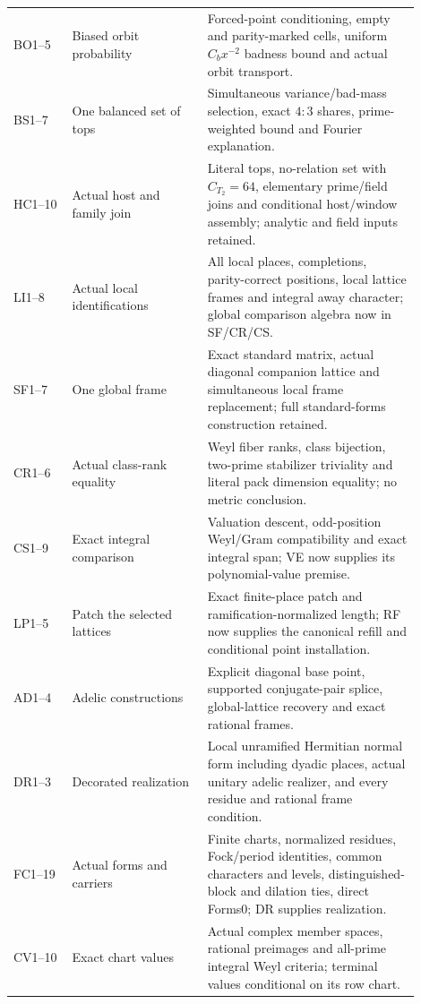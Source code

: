 \documentclass[11pt,a4paper]{article}
\numberwithin{equation}{section}
\theoremstyle{remark}\newtheorem{remark}[theorem]{Remark}
\begin{document}
\begin{longtable}{>{\raggedright\arraybackslash}p{0.13\linewidth}>{\raggedright\arraybackslash}p{0.30\linewidth}>{\raggedright\arraybackslash}p{0.47\linewidth}}
BO1--5 & Biased orbit probability & Forced-point conditioning, empty and parity-marked cells, uniform $C_bx^{-2}$ badness bound and actual orbit transport.\\[3pt]
BS1--7 & One balanced set of tops & Simultaneous variance/bad-mass selection, exact $4:3$ shares, prime-weighted bound and Fourier explanation.\\[3pt]
HC1--10 & Actual host and family join & Literal tops, no-relation set with $C_{T_2}=64$, elementary prime/field joins and conditional host/window assembly; analytic and field inputs retained.\\[3pt]
LI1--8 & Actual local identifications & All local places, completions, parity-correct positions, local lattice frames and integral away character; global comparison algebra now in SF/CR/CS.\\[3pt]
SF1--7 & One global frame & Exact standard matrix, actual diagonal companion lattice and simultaneous local frame replacement; full standard-forms construction retained.\\[3pt]
CR1--6 & Actual class-rank equality & Weyl fiber ranks, class bijection, two-prime stabilizer triviality and literal pack dimension equality; no metric conclusion.\\[3pt]
CS1--9 & Exact integral comparison & Valuation descent, odd-position Weyl/Gram compatibility and exact integral span; VE now supplies its polynomial-value premise.\\[3pt]
LP1--5 & Patch the selected lattices & Exact finite-place patch and ramification-normalized length; RF now supplies the canonical refill and conditional point installation.\\[3pt]
AD1--4 & Adelic constructions & Explicit diagonal base point, supported conjugate-pair splice, global-lattice recovery and exact rational frames.\\[3pt]
DR1--3 & Decorated realization & Local unramified Hermitian normal form including dyadic places, actual unitary adelic realizer, and every residue and rational frame condition.\\[3pt]
FC1--19 & Actual forms and carriers & Finite charts, normalized residues, Fock/period identities, common characters and levels, distinguished-block and dilation ties, direct Forms0; DR supplies realization.\\[3pt]
CV1--10 & Exact chart values & Actual complex member spaces, rational preimages and all-prime integral Weyl criteria; terminal values conditional on its row chart.\\[3pt]

\end{longtable}
\end{document}
